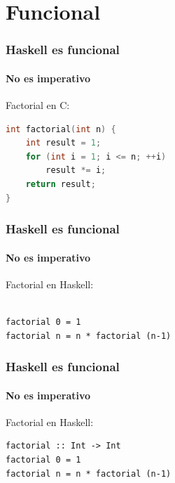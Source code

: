 \documentclass{beamer}
\begin{document}

\section{Funcional}

\begin{frame}[fragile]
  \frametitle{Haskell es funcional}
  \framesubtitle{No es imperativo}

Factorial en C: 

\begin{lstlisting}[language=c]
int factorial(int n) {
    int result = 1;
    for (int i = 1; i <= n; ++i)
        result *= i;
    return result;
}
\end{lstlisting}


\end{frame}


\begin{frame}[fragile]
  \frametitle{Haskell es funcional}
  \framesubtitle{No es imperativo}

Factorial en Haskell: 

\begin{lstlisting}

factorial 0 = 1
factorial n = n * factorial (n-1)
\end{lstlisting}


\end{frame}


\begin{frame}[fragile]
  \frametitle{Haskell es funcional}
  \framesubtitle{No es imperativo}

Factorial en Haskell: 

\begin{lstlisting}
factorial :: Int -> Int
factorial 0 = 1
factorial n = n * factorial (n-1)
\end{lstlisting}


\end{frame}

\end{document}
